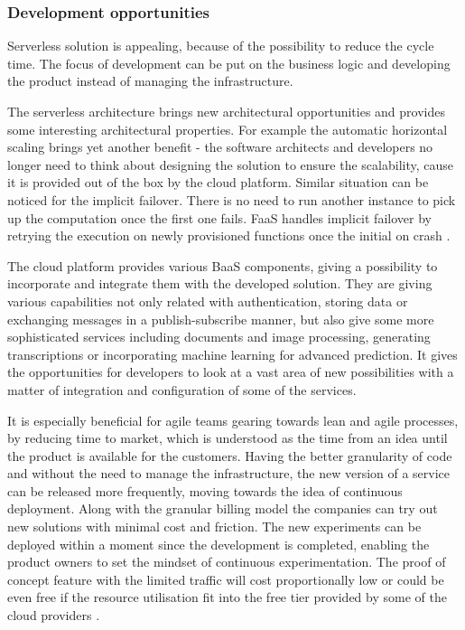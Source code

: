 \subsubsection*{Development opportunities}

Serverless solution is appealing, because of the possibility to reduce the cycle time. The focus of development can be put on the business logic and developing the product instead of managing the infrastructure.

The serverless architecture brings new architectural opportunities and provides some interesting architectural properties. For example the automatic horizontal scaling brings yet another benefit - the software architects and developers no longer need to think about designing the solution to ensure the scalability, cause it is provided out of the box by the cloud platform. Similar situation can be noticed for the implicit failover. There is no need to run another instance to pick up the computation once the first one fails. FaaS handles implicit failover by retrying the execution on newly provisioned functions once the initial on crash \cite{LeveragingServerlessCloudComputingArchitectures}.

The cloud platform provides various BaaS components, giving a possibility to incorporate and integrate them with the developed solution. They are giving various capabilities not only related with authentication, storing data or exchanging messages in a publish-subscribe manner, but also give some more sophisticated services including documents and image processing, generating transcriptions or incorporating machine learning for advanced prediction. It gives the opportunities for developers to look at a vast area of new possibilities with a matter of integration and configuration of some of the services.

It is especially beneficial for agile teams gearing towards lean and agile processes, by reducing time to market, which is understood as the time from an idea until the product is available for the customers. Having the better granularity of code and without the need to manage the infrastructure, the new version of a service can be released more frequently, moving towards the idea of continuous deployment. Along with the granular billing model the companies can try out new solutions with minimal cost and friction. The new experiments can be deployed within a moment since the development is completed, enabling the product owners to set the mindset of continuous experimentation. The proof of concept feature with the limited traffic will cost proportionally low or could be even free if the resource utilisation fit into the free tier provided by some of the cloud providers \cite{MartinFowlerServerless}.

